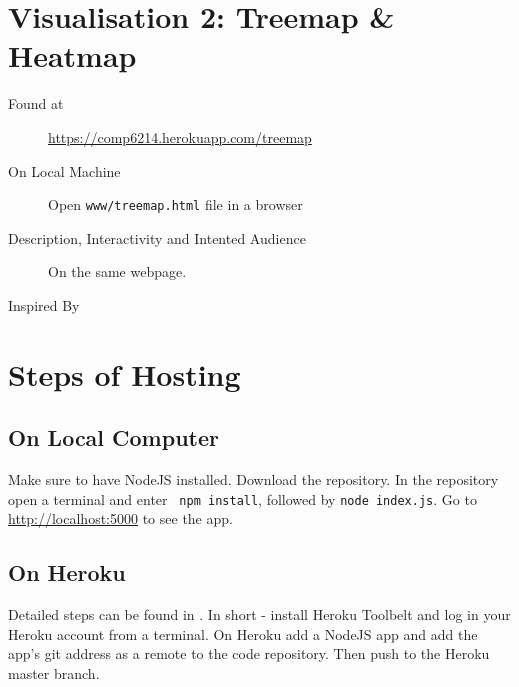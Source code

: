 \documentclass[10pt]{article}
\begin{document}
\section{Visualisation 2: Treemap \& Heatmap}

\begin{description}
\item[Found at ] \url{https://comp6214.herokuapp.com/treemap}
\item[On Local Machine] Open \texttt{www/treemap.html} file in a browser
\item[Description, Interactivity and Intented Audience] On the same webpage.
\item[Inspired By] \cite{mikebostock}
\end{description}

\section{Steps of Hosting}

\subsection{On Local Computer}
Make sure to have NodeJS installed. Download the repository. In the repository open a terminal and enter \texttt{
npm install}, followed by \texttt{node index.js}. Go to \url{http://localhost:5000} to see the app.

\subsection{On Heroku}
Detailed steps can be found in \cite{heroku}. In short - install Heroku Toolbelt and log in your Heroku account from a terminal. On Heroku add a NodeJS app and add the app's git address as a remote to the code repository. Then push to the Heroku master branch.

\medskip


\end{document}

